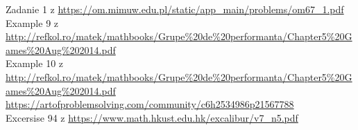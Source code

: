 
 Zadanie 1 z \url{https://om.mimuw.edu.pl/static/app_main/problems/om67_1.pdf} \\
 Example 9 z \url{http://refkol.ro/matek/mathbooks/Grupe%20de%20performanta/Chapter5%20Games%20Aug%202014.pdf} \\
 Example 10 z \url{http://refkol.ro/matek/mathbooks/Grupe%20de%20performanta/Chapter5%20Games%20Aug%202014.pdf} \\
 \url{https://artofproblemsolving.com/community/c6h2534986p21567788} \\
 Excersise 94 z \url{https://www.math.hkust.edu.hk/excalibur/v7_n5.pdf} \\